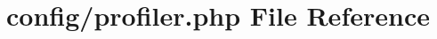 \hypertarget{application_2config_2profiler_8php}{}\section{config/profiler.php File Reference}
\label{application_2config_2profiler_8php}
